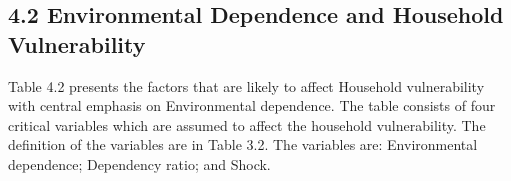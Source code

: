 \documentclass[12pt, a4paper]{article}
\begin{document}
  
\subsection*{4.2 Environmental Dependence and Household Vulnerability}
\renewcommand{\thepage}{\arabic{page}}  
Table 4.2 presents the factors that are likely to affect Household vulnerability with central emphasis on Environmental dependence. The table consists of four critical variables which are assumed to affect the household vulnerability. The definition of the variables are in Table 3.2. The variables are: Environmental dependence; Dependency ratio; and Shock.


\begin{table}[H]
	\captionsetup{labelformat=empty}
	\caption{Table 4.2: Household Vulnerability and Environmental Dependence}
	\renewcommand{\arraystretch}{0.9}
\end{table}
\end{document}
